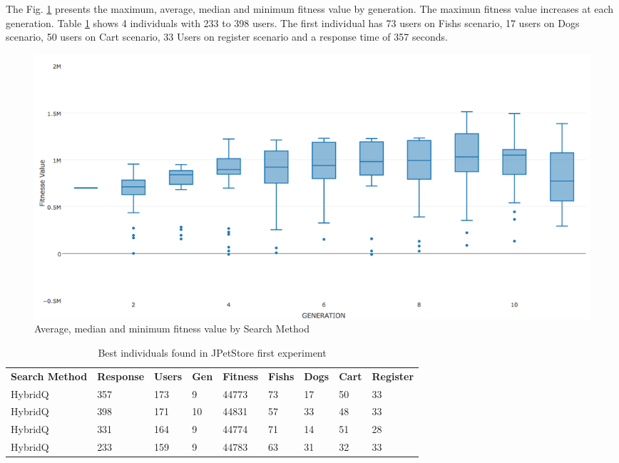 The Fig. \ref{fig:summaryboxplot3} presents the maximum, average, median and minimum fitness value by generation. The maximun fitness value increases at each generation. Table \ref{tab:bestindividuals3} shows 4 individuals with 233 to 398 users.  The first individual has 73 users on Fishs scenario, 17 users on Dogs scenario, 50 users on Cart scenario, 33 Users on register scenario  and a response time of 357 seconds. 

\begin{figure}[h]
\centering
\includegraphics[width=1\textwidth]{./images/experiment3-5.png}
\caption{Average, median and minimum fitness value by Search Method }
\label{fig:summaryboxplot3}
\end{figure}




\begin{table}[h!]
\centering
\caption{Best individuals found in JPetStore first experiment}
\label{tab:bestindividuals3}
\begin{tabular}{lllllllll}
\rowcolor[HTML]{C0C0C0} 
\textbf{Search Method} & \textbf{Response} & \textbf{Users} & \textbf{Gen} & \textbf{Fitness} & \textbf{Fishs} & \textbf{Dogs} & \textbf{Cart} & \textbf{Register} \\
HybridQ                & 357               & 173            & 9            & 44773            & 73             & 17            & 50            & 33                \\
HybridQ                & 398               & 171            & 10           & 44831            & 57             & 33            & 48            & 33                \\
HybridQ                & 331               & 164            & 9            & 44774            & 71             & 14            & 51            & 28                \\
HybridQ                & 233               & 159            & 9            & 44783            & 63             & 31            & 32            & 33               
\end{tabular}
\end{table}

